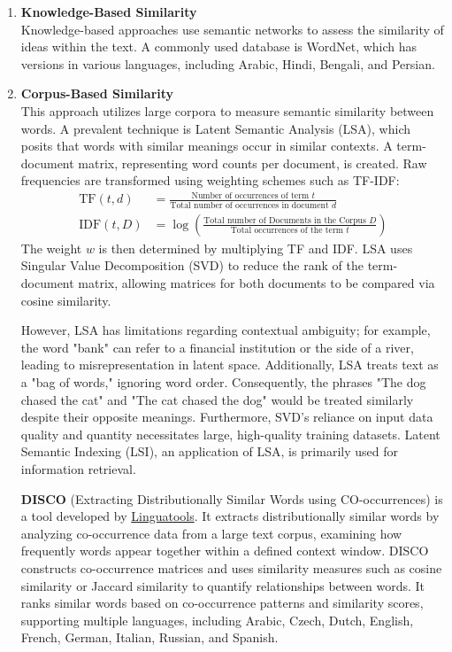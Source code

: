 \documentclass{article}
\begin{document}
	\begin{enumerate}
		\item \textbf{Knowledge-Based Similarity} \\
		Knowledge-based approaches use semantic networks to assess the similarity of ideas within the text. A commonly used database is WordNet, which has versions in various languages, including Arabic, Hindi, Bengali, and Persian.
		
		\item \textbf{Corpus-Based Similarity} \\
		This approach utilizes large corpora to measure semantic similarity between words. A prevalent technique is Latent Semantic Analysis (LSA), which posits that words with similar meanings occur in similar contexts. A term-document matrix, representing word counts per document, is created. Raw frequencies are transformed using weighting schemes such as TF-IDF:
		\begin{align*}
			\text{TF}(t, d) &= \frac{\text{Number of occurrences of term } t}{\text{Total number of occurrences in document } d} \\
			\text{IDF}(t, D) &= \log \left( \frac{\text{Total number of Documents in the Corpus } D}{\text{Total occurrences of the term } t} \right)
		\end{align*}
		The weight \( w \) is then determined by multiplying TF and IDF. LSA uses Singular Value Decomposition (SVD) to reduce the rank of the term-document matrix, allowing matrices for both documents to be compared via cosine similarity.
		
		However, LSA has limitations regarding contextual ambiguity; for example, the word "bank" can refer to a financial institution or the side of a river, leading to misrepresentation in latent space. Additionally, LSA treats text as a "bag of words," ignoring word order. Consequently, the phrases "The dog chased the cat" and "The cat chased the dog" would be treated similarly despite their opposite meanings. Furthermore, SVD's reliance on input data quality and quantity necessitates large, high-quality training datasets. Latent Semantic Indexing (LSI), an application of LSA, is primarily used for information retrieval.
		
		\textbf{DISCO} (Extracting Distributionally Similar Words using CO-occurrences) is a tool developed by \href{https://www.linguatools.de/disco/disco_en.html}{Linguatools}. It extracts distributionally similar words by analyzing co-occurrence data from a large text corpus, examining how frequently words appear together within a defined context window. DISCO constructs co-occurrence matrices and uses similarity measures such as cosine similarity or Jaccard similarity to quantify relationships between words. It ranks similar words based on co-occurrence patterns and similarity scores, supporting multiple languages, including Arabic, Czech, Dutch, English, French, German, Italian, Russian, and Spanish.
		

\end{enumerate}
\end{document}
